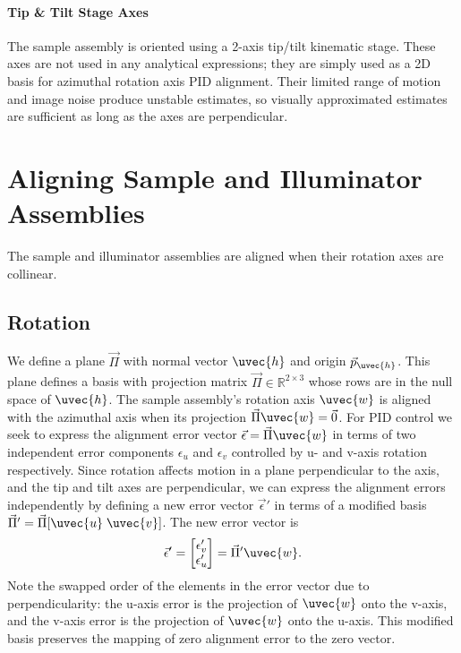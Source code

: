 \paragraph{Tip \& Tilt Stage Axes} The sample assembly is oriented using a 2-axis tip/tilt kinematic stage. These axes are not used in any analytical expressions; they are simply used as a 2D basis for azimuthal rotation axis PID alignment. Their limited range of motion and image noise produce unstable estimates, so visually approximated estimates are sufficient as long as the axes are perpendicular.

\section{Aligning Sample and Illuminator Assemblies} %
The sample and illuminator assemblies are aligned when their rotation axes are collinear. 

\subsection{Rotation}
We define a plane $\vec{\Pi}$ with normal vector $\uvec{h}$ and origin $\vec{p}_{\uvec{h}}$. This plane defines a basis with projection matrix $\vec{\Pi} \in \mathbb{R}^{2 \times 3}$ whose rows are in the null space of $\uvec{h}$. The sample assembly's rotation axis $\uvec{w}$ is aligned with the azimuthal axis when its projection $\vec{\Pi} \uvec{w} = \vec{0}$. For PID control we seek to express the alignment error vector $\vec{\epsilon} = \vec{\Pi} \uvec{w}$ in terms of two independent error components $\epsilon_u$ and $\epsilon_v$ controlled by u- and v-axis rotation respectively. Since rotation affects motion in a plane perpendicular to the axis, and the tip and tilt axes are perpendicular, we can express the alignment errors independently by defining a new error vector $\vec{\epsilon}'$ in terms of a modified basis $\vec{\Pi}' = \vec{\Pi} [\uvec{u} \; \uvec{v}]$. The new error vector is
%
\begin{equation}
    \vec{\epsilon}' = 
    \begin{bmatrix}
        \epsilon'_v \\
        \epsilon'_u
    \end{bmatrix} = \vec{\Pi}' \uvec{w}.
\end{equation}
Note the swapped order of the elements in the error vector due to perpendicularity: the u-axis error is the projection of $\uvec{w}$ onto the v-axis, and the v-axis error is the projection of $\uvec{w}$ onto the u-axis. This modified basis preserves the mapping of zero alignment error to the zero vector.

